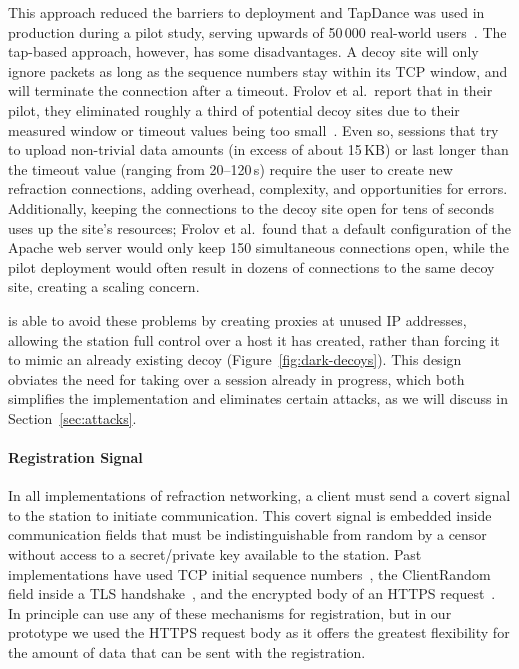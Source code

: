 This approach reduced the barriers to deployment and TapDance was used in production during a pilot study, serving upwards of 50\,000 real-world users~\cite{frolov2017isp}. 
The tap-based approach, however, has some disadvantages. A decoy site will only ignore packets as long as the sequence numbers stay within its TCP window, and will terminate the connection after a timeout. Frolov et al.\ report that in their pilot, they eliminated roughly a third of potential decoy sites due to their measured window or timeout values being too small~\cite{frolov2017isp}. Even so, sessions that try to upload non-trivial data amounts (in excess of about 15\,KB) or last longer than the timeout value (ranging from 20--120\,s) require the user to create new refraction connections, adding overhead, complexity, and opportunities for errors. Additionally, keeping the connections to the decoy site open for tens of seconds uses up the site's resources; Frolov et al.\ found that a default configuration of the Apache web server would only keep 150 simultaneous connections open, while the pilot deployment would often result in dozens of connections to the same decoy site, creating a scaling concern.

\scheme is able to avoid these problems by creating proxies at unused IP addresses, allowing the station full control over a host it has created, rather than forcing it to mimic an already existing decoy (Figure~\ref{fig:dark-decoys}).
This design obviates the need for taking over a session already in progress, which both simplifies the implementation and eliminates certain attacks, as we will discuss in Section~\ref{sec:attacks}.

\paragraph{Registration Signal} In all implementations of refraction networking, a client must send a covert signal to the station to initiate communication. This covert signal is  embedded inside communication fields that must be indistinguishable from random by a censor without access to a secret/private key available to the station. Past implementations have used TCP initial sequence numbers~\cite{cirripede11}, the ClientRandom field inside a TLS handshake~\cite{curveball11,telex11}, and the encrypted body of an HTTPS request~\cite{tapdance14}. In principle \scheme can use any of these mechanisms for registration, but in our prototype we used the HTTPS request body as it offers the greatest flexibility for the amount of data that can be sent with the registration.
